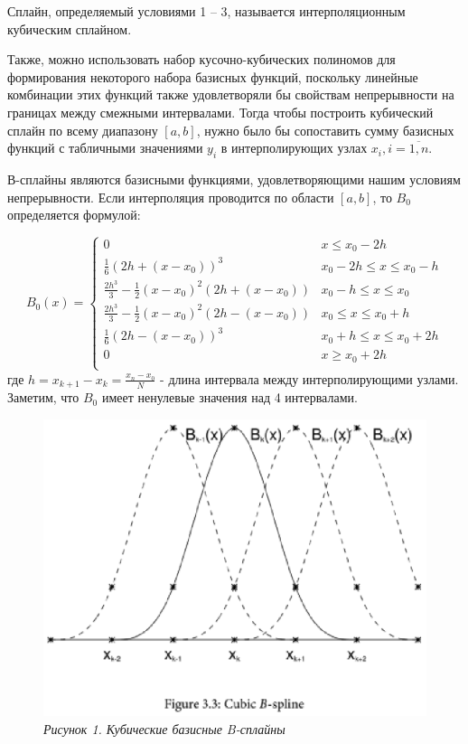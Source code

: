 \documentclass [12pt]{article}
\begin{document}
Сплайн, определяемый условиями 1 – 3, называется интерполяционным кубическим сплайном.

Также, можно использовать набор кусочно-кубических полиномов для формирования некоторого набора базисных функций, поскольку линейные комбинации этих функций также удовлетворяли бы свойствам непрерывности на границах между смежными интервалами. Тогда чтобы построить кубический сплайн по всему диапазону $[a, b]$, нужно было бы сопоставить сумму базисных функций с табличными значениями $y_i$ в интерполирующих узлах $x_i, i = \overline{1,n}$. 

В-сплайны являются базисными функциями, удовлетворяющими нашим условиям непрерывности. Если интерполяция проводится по области $[a, b]$, то $B_0$ определяется формулой:


\begin{equation*}
B_0(x) =  
\begin{cases}
0 & x \leq x_0 - 2h \\
\frac{1}{6}(2h + (x - x_0))^3 & x_0-2h \leq x \leq x_0 -h \\
\frac{2h^3}{3}-\frac{1}{2}(x-x_0)^2(2h + (x - x_0)) & x_0-h \leq x \leq x_0 \\
\frac{2h^3}{3}-\frac{1}{2}(x-x_0)^2(2h - (x - x_0)) & x_0 \leq x \leq x_0+h \\
\frac{1}{6}(2h - (x - x_0))^3 & x_0+h \leq x \leq x_0 +2h \\
0 & x \geq x_0 + 2h \\
\end{cases}
\end{equation*}
где $h=x_{k+1}-x_{k}=\frac{x_n-x_0}{N}$ - длина интервала между интерполирующими узлами. Заметим, что $B_0$ имеет ненулевые значения над 4 интервалами.

\begin{figure}[h]
\begin{center}
\includegraphics[scale=.9]{2.eps}\\
\textit{Рисунок 1. Кубические базисные B-сплайны}
\end{center}
\end{figure}
\end{document}
